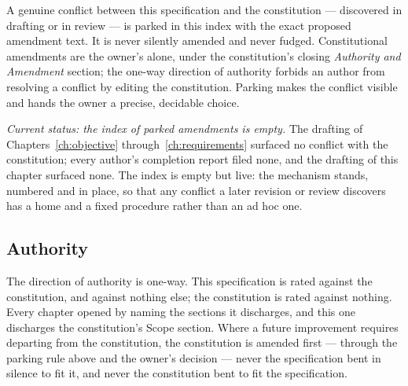 \begin{principle}
A genuine conflict between this specification and the constitution --- discovered in
drafting or in review --- is parked in this index with the exact proposed amendment text.
It is never silently amended and never fudged. Constitutional amendments are the owner's
alone, under the constitution's closing \emph{Authority and Amendment} section; the
one-way direction of authority forbids an author from resolving a conflict by editing the
constitution. Parking makes the conflict visible and hands the owner a precise, decidable
choice.
\end{principle}

\emph{Current status: the index of parked amendments is empty.} The drafting of
Chapters~\ref{ch:objective} through~\ref{ch:requirements} surfaced no conflict with the
constitution; every author's completion report filed none, and the drafting of this
chapter surfaced none. The index is empty but live: the mechanism stands, numbered and
in place, so that any conflict a later revision or review discovers has a home and a fixed
procedure rather than an ad hoc one.

\subsection{Authority}

The direction of authority is one-way. This specification is rated against the
constitution, and against nothing else; the constitution is rated against nothing. Every
chapter opened by naming the sections it discharges, and this one discharges the
constitution's Scope section. Where a future improvement requires departing from the
constitution, the constitution is amended first --- through the parking rule above and the
owner's decision --- never the specification bent in silence to fit it, and never the
constitution bent to fit the specification.
